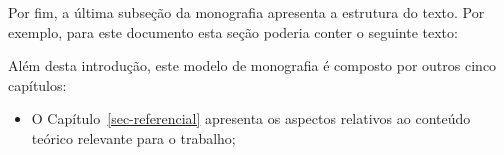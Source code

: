 Por fim, a última subseção da monografia apresenta a estrutura do texto. Por exemplo, para este documento esta seção poderia conter o seguinte texto:

Além desta introdução, este modelo de monografia é composto por outros cinco capítulos:

\begin{itemize}
	\item O Capítulo~\ref{sec-referencial} apresenta os aspectos relativos ao conteúdo teórico relevante para o trabalho;
\end{itemize}


